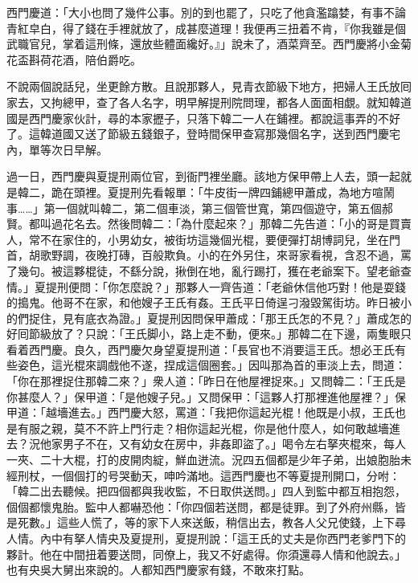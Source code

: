 西門慶道：「大小也問了幾件公事。別的到也罷了，只吃了他貪濫蹹婪，有事不論青紅皁白，得了錢在手裡就放了，{}成甚麼道理！我便再三扭着不肯，『你我雖是個武職官兒，掌着這刑條，還放些體面纔好。』」說未了，酒菜齊至。西門慶將小金菊花盃斟荷花酒，陪伯爵吃。

不說兩個說話兒，坐更餘方散。且說那夥人，見青衣節級下地方，把婦人王氏放囘家去，又拘總甲，查了各人名字，明早解提刑院問理，都各人面面相覷。{}就知韓道國是西門慶家伙計，尋的本家攊子，只落下韓二一人在鋪裡。都說這事弄的不好了。這韓道國又送了節級五錢銀子，登時間保甲查寫那幾個名字，送到西門慶宅內，單等次日早解。

過一日，西門慶與夏提刑兩位官，到衙門裡坐廳。該地方保甲帶上人去，頭一起就是韓二，跪在頭裡。夏提刑先看報單：「牛皮街一牌四鋪總甲蕭成，為地方喧鬧事……」第一個就叫韓二，第二個車淡，第三個管世寬，第四個遊守，第五個郝賢。都叫過花名去。然後問韓二：「為什麼起來？」那韓二先告道：「小的哥是買賣人，常不在家住的，小男幼女，被街坊這幾個光棍，要便彈打胡博詞兒，坐在門首，胡歌野調，夜晚打磚，百般欺負。小的在外另住，來哥家看視，含忍不過，罵了幾句。被這夥棍徒，不繇分說，揪倒在地，亂行踢打，獲在老爺案下。望老爺查情。」夏提刑便問：「你怎麼說？」那夥人一齊告道：「老爺休信他巧對！他是耍錢的搗鬼。他哥不在家，和他嫂子王氏有姦。王氏平日倚逞刁潑毀駕街坊。昨日被小的們捉住，見有底衣為證。」夏提刑因問保甲蕭成：「那王氏怎的不見？」蕭成怎的好囘節級放了？只說：「王氏脚小，路上走不動，便來。」那韓二在下邊，兩隻眼只看着西門慶。良久，西門慶欠身望夏提刑道：「長官也不消要這王氏。想必王氏有些姿色，這光棍來調戲他不遂，捏成這個圈套。」{}因叫那為首的車淡上去，問道：「你在那裡捉住那韓二來？」衆人道：「昨日在他屋裡捉來。」又問韓二：「王氏是你甚麼人？」保甲道：「是他嫂子兒。」又問保甲：「這夥人打那裡進他屋裡？」保甲道：「越墻進去。」西門慶大怒，罵道：「我把你這起光棍！他既是小叔，王氏也是有服之親，莫不不許上門行走？相你這起光棍，你是他什麼人，如何敢越墻進去？況他家男子不在，又有幼女在房中，非姦即盜了。」{}喝令左右拏夾棍來，每人一夾、二十大棍，打的皮開肉綻，鮮血迸流。況四五個都是少年子弟，出娘胞胎未經刑杖，一個個打的号哭動天，呻吟滿地。這西門慶也不等夏提刑開口，分咐：「韓二出去聽候。把四個都與我收監，不日取供送問。」四人到監中都互相抱怨，個個都懷鬼胎。監中人都嚇恐他：「你四個若送問，都是徒罪。到了外府州縣，皆是死數。」這些人慌了，等的家下人來送飯，稍信出去，教各人父兄使錢，上下尋人情。內中有拏人情央及夏提刑，夏提刑說：「這王氏的丈夫是你西門老爹門下的夥計。他在中間扭着要送問，同僚上，我又不好處得。你須還尋人情和他說去。」也有央吳大舅出來說的。人都知西門慶家有錢，不敢來打點。

